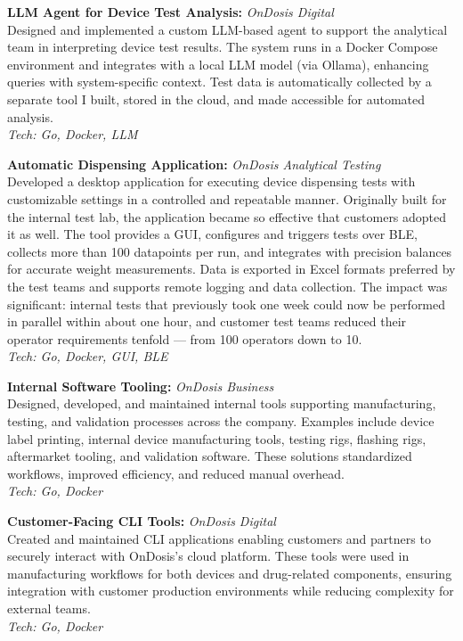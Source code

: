 

\SmallSep
\textbf{LLM Agent for Device Test Analysis:} \textit{OnDosis Digital} \\
Designed and implemented a custom LLM-based agent to support the analytical team in interpreting device test results. The system runs in a Docker Compose environment and integrates with a local LLM model (via Ollama), enhancing queries with system-specific context. Test data is automatically collected by a separate tool I built, stored in the cloud, and made accessible for automated analysis. \\
\textit{Tech: Go, Docker, LLM} \\
\SmallSep

\textbf{Automatic Dispensing Application:} \textit{OnDosis Analytical Testing} \\
Developed a desktop application for executing device dispensing tests with customizable settings in a controlled and repeatable manner. Originally built for the internal test lab, the application became so effective that customers adopted it as well. The tool provides a GUI, configures and triggers tests over BLE, collects more than 100 datapoints per run, and integrates with precision balances for accurate weight measurements. Data is exported in Excel formats preferred by the test teams and supports remote logging and data collection. The impact was significant: internal tests that previously took one week could now be performed in parallel within about one hour, and customer test teams reduced their operator requirements tenfold — from 100 operators down to 10. \\
\textit{Tech: Go, Docker, GUI, BLE} \\
\SmallSep

\textbf{Internal Software Tooling:} \textit{OnDosis Business} \\
Designed, developed, and maintained internal tools supporting manufacturing, testing, and validation processes across the company. Examples include device label printing, internal device manufacturing tools, testing rigs, flashing rigs, aftermarket tooling, and validation software. These solutions standardized workflows, improved efficiency, and reduced manual overhead. \\
\textit{Tech: Go, Docker} \\
\SmallSep

\textbf{Customer-Facing CLI Tools:} \textit{OnDosis Digital} \\
Created and maintained CLI applications enabling customers and partners to securely interact with OnDosis’s cloud platform. These tools were used in manufacturing workflows for both devices and drug-related components, ensuring integration with customer production environments while reducing complexity for external teams. \\
\textit{Tech: Go, Docker} \\
\SmallSep

